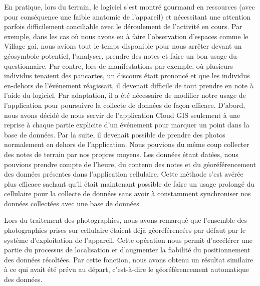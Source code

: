 En pratique, lors du terrain, le logiciel s'est montré gourmand en ressources (avec pour conséquence une faible anatomie de l'appareil) et nécessitant une attention parfois difficilement conciliable avec le déroulement de l'activité en cours. 
Par exemple, dans les cas où nous avons eu à faire l'observation d'espaces comme le Village gai, nous avions tout le temps disponible pour nous arrêter devant un géosymbole potentiel, l'analyser, prendre des notes et faire un bon usage du questionnaire. 
Par contre, lors de manifestations par exemple, où plusieurs individus tenaient des pancartes, un discours était prononcé et que les individus en-dehors de l'événement réagissait, il devenait difficile de tout prendre en note à l'aide du logiciel. 
Par adaptation, il a été nécessaire de modifier notre usage de l'application pour poursuivre la collecte de données de façon efficace. 
D'abord, nous avons décidé de nous servir de l'application Cloud GIS seulement à une reprise à chaque partie explicite d'un événement pour marquer un point dans la base de données. 
Par la suite, il devenait possible de prendre des photos normalement en dehors de l'application. 
Nous pouvions du même coup collecter des notes de terrain par nos propres moyens.
Les données étant datées, nous pouvions prendre compte de l'heure, du contenu des notes et du géoréférencement des données présentes dans l'application cellulaire. 
Cette méthode s'est avérée plus efficace sachant qu'il était maintenant possible de faire un usage prolongé du cellulaire pour la collecte de données sans avoir à constamment synchroniser nos données collectées avec une base de données.

Lors du traitement des photographies, nous avons remarqué que l'ensemble des photographies prises sur cellulaire étaient déjà géoréférencées par défaut par le système d'exploitation de l'appareil. 
Cette opération nous permit d'accélérer une partie du processus de localisation et d'augmenter la fiabilité du positionnement des données récoltées. 
Par cette fonction, nous avons obtenu un résultat similaire à ce qui avait été prévu au départ, c'est-à-dire le géoréférencement automatique des données. 

